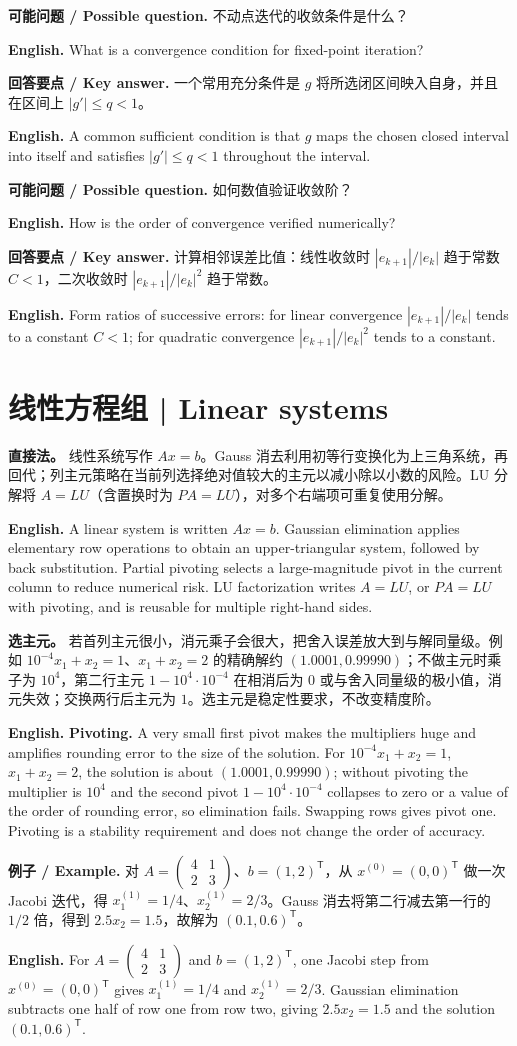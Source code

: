 \documentclass[UTF8,11pt,a4paper]{ctexart}
\newcommand{\EN}[1]{\par\noindent\textbf{English.} #1\par}
\newcommand{\EX}[2]{\par\noindent\textbf{例子 / Example.} #1\par\EN{#2}}
\newcommand{\ASK}[4]{\par\noindent\textbf{可能问题 / Possible question.} #1\par\EN{#2}\noindent\textbf{回答要点 / Key answer.} #3\par\EN{#4}\medskip}
\begin{document}
\ASK{不动点迭代的收敛条件是什么？}{What is a convergence condition for fixed-point iteration?}{一个常用充分条件是 $g$ 将所选闭区间映入自身，并且在区间上 $|g'|\le q<1$。}{A common sufficient condition is that $g$ maps the chosen closed interval into itself and satisfies $|g'|\le q<1$ throughout the interval.}

\ASK{如何数值验证收敛阶？}{How is the order of convergence verified numerically?}{计算相邻误差比值：线性收敛时 $|e_{k+1}|/|e_k|$ 趋于常数 $C<1$，二次收敛时 $|e_{k+1}|/|e_k|^2$ 趋于常数。}{Form ratios of successive errors: for linear convergence $|e_{k+1}|/|e_k|$ tends to a constant $C<1$; for quadratic convergence $|e_{k+1}|/|e_k|^2$ tends to a constant.}

\section{线性方程组 | Linear systems}
\noindent\textbf{直接法。} 线性系统写作 $Ax=b$。Gauss 消去利用初等行变换化为上三角系统，再回代；列主元策略在当前列选择绝对值较大的主元以减小除以小数的风险。LU 分解将 $A=LU$（含置换时为 $PA=LU$），对多个右端项可重复使用分解。

\EN{A linear system is written $Ax=b$. Gaussian elimination applies elementary row operations to obtain an upper-triangular system, followed by back substitution. Partial pivoting selects a large-magnitude pivot in the current column to reduce numerical risk. LU factorization writes $A=LU$, or $PA=LU$ with pivoting, and is reusable for multiple right-hand sides.}

\noindent\textbf{选主元。} 若首列主元很小，消元乘子会很大，把舍入误差放大到与解同量级。例如 $10^{-4}x_1+x_2=1$、$x_1+x_2=2$ 的精确解约 $(1.0001,0.99990)$；不做主元时乘子为 $10^{4}$，第二行主元 $1-10^{4}\cdot10^{-4}$ 在相消后为 $0$ 或与舍入同量级的极小值，消元失效；交换两行后主元为 $1$。选主元是稳定性要求，不改变精度阶。
\EN{\textbf{Pivoting.} A very small first pivot makes the multipliers huge and amplifies rounding error to the size of the solution. For $10^{-4}x_1+x_2=1$, $x_1+x_2=2$, the solution is about $(1.0001,0.99990)$; without pivoting the multiplier is $10^{4}$ and the second pivot $1-10^{4}\cdot10^{-4}$ collapses to zero or a value of the order of rounding error, so elimination fails. Swapping rows gives pivot one. Pivoting is a stability requirement and does not change the order of accuracy.}
\EX{对 $A=\begin{pmatrix}4&1\\2&3\end{pmatrix}$、$b=(1,2)^{\mathsf T}$，从 $x^{(0)}=(0,0)^{\mathsf T}$ 做一次 Jacobi 迭代，得 $x_1^{(1)}=1/4$、$x_2^{(1)}=2/3$。Gauss 消去将第二行减去第一行的 $1/2$ 倍，得到 $2.5x_2=1.5$，故解为 $(0.1,0.6)^{\mathsf T}$。}{For $A=\begin{pmatrix}4&1\\2&3\end{pmatrix}$ and $b=(1,2)^{\mathsf T}$, one Jacobi step from $x^{(0)}=(0,0)^{\mathsf T}$ gives $x_1^{(1)}=1/4$ and $x_2^{(1)}=2/3$. Gaussian elimination subtracts one half of row one from row two, giving $2.5x_2=1.5$ and the solution $(0.1,0.6)^{\mathsf T}$.}
\end{document}
